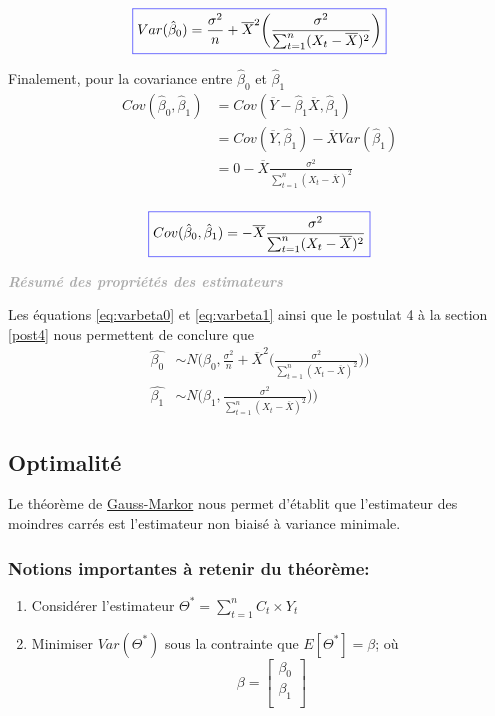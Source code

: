 \documentclass[11pt,french]{report}
\newenvironment{moreInfo}[1]
	{\begin{mdframed}
	\textcolor{darkgray}{\huge \raisebox{-3.5pt}{\faInfo} 
	\hspace{0.5cm} \large\bfseries #1}\\[5pt]
	\normalsize
	\makebox[0.1\textwidth][l]{}	
	\begin{minipage}{10cm}}
	{	\end{minipage}
	\end{mdframed}}
\begin{document}
\begin{equation}
\label{eq:varbeta0}
\color{blue}
\boxed{\color{black}
Var(\hat{\beta}_0) = \frac{\sigma^2}{n}  + \overline{X}^2 \bigg(\frac{\sigma^2}{\sum_{t=1}^n (X_t - \overline{X})^2}\bigg)}
\end{equation}

Finalement, pour la covariance entre $\hat{\beta}_0$ et $\hat{\beta}_1$
\begin{align*}
Cov(\hat{\beta}_0, \hat{\beta}_1) &= Cov(\overline{Y} - \hat{\beta}_1\overline{X}, \hat{\beta}_1) \\
&= Cov(\overline{Y},  \hat{\beta}_1) - \overline{X} Var(\hat{\beta}_1) \\
&= 0 - \overline{X} \frac{\sigma^2}{\sum_{t=1}^n (X_t - \overline{X})^2} \\
\end{align*}

\begin{equation}
\label{eq:covariance}
\color{blue}
\boxed{\color{black}
Cov(\hat{\beta}_0, \hat{\beta}_1) = - \overline{X} \frac{\sigma^2}{\sum_{t=1}^n (X_t - \overline{X})^2}}
\end{equation}

\bigskip
\begin{moreInfo}{\emph{Résumé des propriétés des estimateurs}}
\label{res:estima}
	Les équations \ref{eq:varbeta0} et \ref{eq:varbeta1}  ainsi que le postulat 4 à la section \ref{post4} nous permettent de conclure que 
	\begin{align*}
	     \hat{\beta_0} &\sim N\Bigg(\beta_0, \frac{\sigma^2}{n}  + \overline{X}^2 \bigg(\frac{\sigma^2}{\sum_{t=1}^n (X_t - \overline{X})^2}\bigg)\Bigg) \\
	     \hat{\beta_1} &\sim N\Bigg(\beta_1, \frac{\sigma^2}{\sum_{t=1}^n(X_t - \overline{X})^2})\Bigg)
	\end{align*}

\end{moreInfo}
\bigskip

\subsection{Optimalité}
Le théorème de \href{https://fr.wikipedia.org/wiki/Théorème_de_Gauss-Markov}{Gauss-Markor} nous permet d'établit que l'estimateur des moindres carrés est l'estimateur non biaisé à variance minimale. 

\subsubsection*{Notions importantes à retenir du théorème:}
\begin{enumerate}
\item Considérer l'estimateur $\Theta^* = \sum_{t=1}^n C_t \times Y_t$
\item Minimiser $Var(\Theta^*)$ sous la contrainte que $E[\Theta^*] = \beta$; où
$$ \beta =
\begin{bmatrix}
  \beta_0 \\
  \beta_1 \\ 
\end{bmatrix} $$
\end{enumerate}
\end{document}
